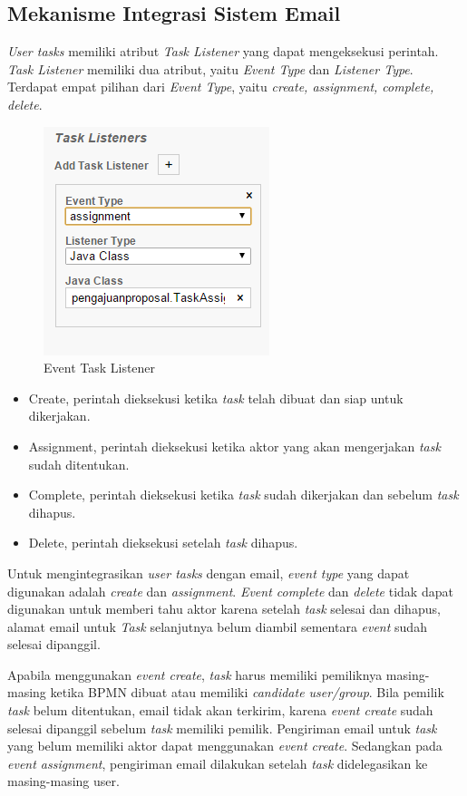 \subsection{Mekanisme Integrasi Sistem Email}
\label{integrasi}
\textit{User tasks} memiliki atribut \textit{Task Listener} yang dapat mengeksekusi perintah. \textit{Task Listener} memiliki dua atribut, yaitu \textit{Event Type} dan \textit{Listener Type}. Terdapat empat pilihan dari \textit{Event Type}, yaitu \textit{create, assignment, complete, delete}. 
		\begin{figure}[H]
			\centering
			\includegraphics[scale=1]{Gambar/Bab-3/TaskListener}
			\caption{Event Task Listener} 
			\label{fig:eventtasklistener}
		\end{figure}
\begin{itemize}
	\item Create, perintah dieksekusi ketika \textit{task} telah dibuat dan siap untuk dikerjakan. 
	\item Assignment, perintah dieksekusi ketika aktor yang akan mengerjakan \textit{task} sudah ditentukan.
	\item Complete, perintah dieksekusi ketika \textit{task} sudah dikerjakan dan sebelum \textit{task} dihapus.
	\item Delete, perintah dieksekusi setelah \textit{task} dihapus.
\end{itemize}


Untuk mengintegrasikan \textit{user tasks} dengan email, \textit{event type} yang dapat digunakan adalah \textit{create} dan \textit{assignment}. \textit{Event complete} dan \textit{delete} tidak dapat digunakan untuk memberi tahu aktor karena setelah \textit{task} selesai dan dihapus, alamat email untuk \textit{Task} selanjutnya belum diambil sementara \textit{event} sudah selesai dipanggil.

Apabila menggunakan \textit{event create}, \textit{task} harus memiliki pemiliknya masing-masing ketika BPMN dibuat atau memiliki \textit{candidate user/group}. Bila pemilik \textit{task} belum ditentukan, email tidak akan terkirim, karena \textit{event create} sudah selesai dipanggil sebelum \textit{task} memiliki pemilik. Pengiriman email untuk \textit{task} yang belum memiliki aktor dapat menggunakan \textit{event create}. Sedangkan pada \textit{event assignment}, pengiriman email dilakukan setelah \textit{task} didelegasikan ke masing-masing user.


